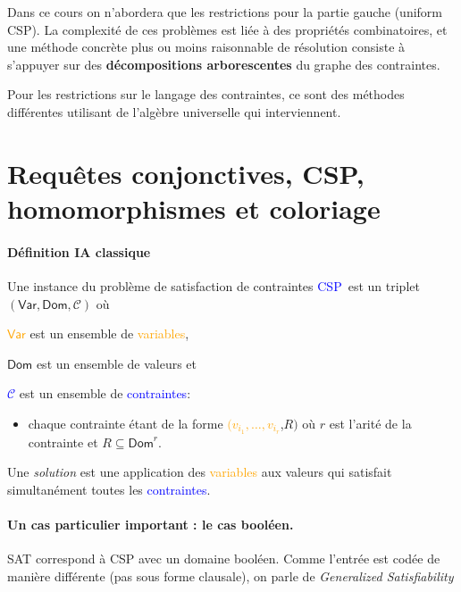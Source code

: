 \documentclass[a4paper,12pt]{article}
\theoremstyle{definition}
\theoremstyle{remark}
\newcommand{\Var}[0]{\ensuremath{\mathsf{Var}}}
\newcommand{\Dom}[0]{\ensuremath{\mathsf{Dom}}}
\begin{document}
Dans ce cours on n'abordera que les restrictions pour la partie gauche
(uniform CSP). La complexité de ces problèmes est liée à des
propriétés combinatoires, et une méthode concrète plus ou moins raisonnable de
résolution consiste à s'appuyer sur des \textbf{décompositions arborescentes}
du graphe des contraintes.

Pour les restrictions sur le langage des contraintes, ce sont des
méthodes différentes utilisant de l'algèbre universelle qui
interviennent. 

\section{Requêtes conjonctives, CSP, homomorphismes et coloriage}
\begin{framed}
  \paragraph*{Définition IA \og classique \fg }
  Une instance du problème de satisfaction de contraintes
  \textcolor{blue}{CSP}\ est un triplet $(\Var,\Dom,\mathcal{C})$ où
  \begin{compactitem}
  \item \textcolor{orange}{$\Var$} est un ensemble de
    \textcolor{orange}{variables},
  \item \textcolor{OliveGreen}{$\Dom$} est un ensemble de
    \textcolor{OliveGreen}{valeurs} et
  \item \textcolor{blue}{$\mathcal{C}$} est un ensemble de
    \textcolor{blue}{contraintes}:
    \begin{itemize}
    \item chaque contrainte étant de la forme
      \textcolor{orange}{$(v_{i_1},\ldots,v_{i_r}$},\textcolor{OliveGreen}{$R)$}
      où $r$ est l'arité de la contrainte et \textcolor{OliveGreen}{$R
        \subseteq \Dom^r$}.
    \end{itemize}
  \end{compactitem}

  Une \emph{solution} est une application des
  \textcolor{orange}{variables} aux \textcolor{OliveGreen}{valeurs}
  qui satisfait simultanément toutes les
  \textcolor{blue}{contraintes}.
\end{framed}
\paragraph{Un cas particulier important : le cas booléen.}
SAT correspond à CSP avec un domaine booléen.
Comme l'entrée est codée de manière différente (pas sous forme clausale), on parle de
\emph{\textsl{Generalized Satisfiability}}
\end{document}
